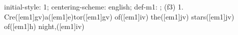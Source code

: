 initial-style: 1;
centering-scheme: english;
def-m1: \grealign;
(f3) 1. Cre([em1]gv)a([em1]e)tor([em1]gv) of([em1]iv) the([em1]jv) stars([em1]jv) of([em1]h) night,([em1]iv)